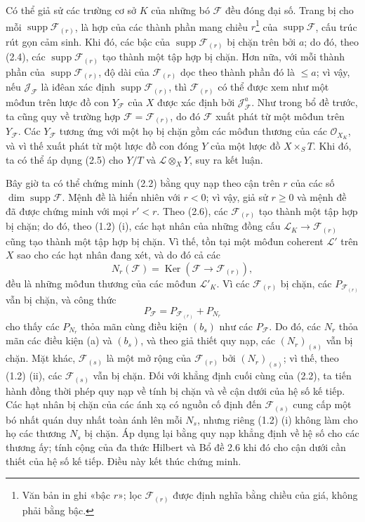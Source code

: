 Có thể giả sử các trường cơ sở $K$ của những bó $\mathcal F$ đều đóng đại số.
Trang bị cho mỗi $\operatorname{supp}\mathcal F_{(r)}$, là hợp của các thành
phần mang chiều $r$\footnote{Văn bản in ghi «bậc $r$»; lọc
$\mathcal F_{(r)}$ được định nghĩa bằng chiều của giá, không phải bằng bậc.}
của $\operatorname{supp}\mathcal F$, cấu trúc rút gọn cảm sinh. Khi đó, các
bậc của $\operatorname{supp}\mathcal F_{(r)}$ bị chặn trên bởi $a$; do đó,
theo (2.4), các $\operatorname{supp}\mathcal F_{(r)}$ tạo thành một tập hợp bị
chặn. Hơn nữa, với mỗi thành phần của
$\operatorname{supp}\mathcal F_{(r)}$, độ dài của $\mathcal F_{(r)}$ dọc theo
thành phần đó là $\leq a$; vì vậy, nếu $\mathcal J_{\mathcal F}$ là iđêan xác
định $\operatorname{supp}\mathcal F_{(r)}$, thì $\mathcal F_{(r)}$
có thể được xem như một môđun trên lược đồ con $Y_{\mathcal F}$ của $X$ được
xác định bởi $\mathcal J_{\mathcal F}^{a}$. Như trong bổ đề trước, ta cũng quy
về trường hợp $\mathcal F=\mathcal F_{(r)}$, do đó $\mathcal F$ xuất phát từ
một môđun trên $Y_{\mathcal F}$. Các $Y_{\mathcal F}$ tương ứng với một họ bị
chặn gồm các môđun thương của các $\mathcal O_{X_K}$, và vì thế xuất phát từ
một lược đồ con đóng $Y$ của một lược đồ $X\times_S T$. Khi đó, ta có thể áp
dụng (2.5) cho $Y/T$ và $\mathcal L\otimes_XY$, suy ra kết luận.

Bây giờ ta có thể chứng minh (2.2) bằng quy nạp theo cận trên $r$ của các số
$\dim\operatorname{supp}\mathcal F$. Mệnh đề là hiển nhiên với $r<0$; vì vậy,
giả sử $r\geq0$ và mệnh đề đã được chứng minh với mọi $r'<r$. Theo (2.6), các
$\mathcal F_{(r)}$ tạo thành một tập hợp bị chặn; do đó, theo (1.2) (i), các
hạt nhân của những đồng cấu
$\mathcal L_K\longrightarrow\mathcal F_{(r)}$ cũng tạo thành một tập hợp bị
chặn. Vì thế, tồn tại một môđun coherent $\mathcal L'$ trên $X$ sao cho các hạt
nhân đang xét, và do đó cả các
\[
N_r(\mathcal F)=\operatorname{Ker}(\mathcal F\longrightarrow\mathcal F_{(r)}),
\]
đều là những môđun thương của các môđun $\mathcal L'_K$. Vì các
$\mathcal F_{(r)}$ bị chặn, các $P_{\mathcal F_{(r)}}$ vẫn bị chặn, và công
thức
\[
P_{\mathcal F}=P_{\mathcal F_{(r)}}+P_{N_r}
\]
cho thấy các $P_{N_r}$ thỏa mãn cùng điều kiện $(b_s)$ như các
$P_{\mathcal F}$. Do đó, các $N_r$ thỏa mãn các điều kiện (a) và $(b_s)$, và
theo giả thiết quy nạp, các $(N_r)_{(s)}$ vẫn bị chặn. Mặt khác,
$\mathcal F_{(s)}$ là một mở rộng của $\mathcal F_{(r)}$ bởi
$(N_r)_{(s)}$; vì thế, theo (1.2) (ii), các $\mathcal F_{(s)}$ vẫn bị chặn.
Đối với khẳng định cuối cùng của (2.2), ta tiến hành đồng thời phép quy nạp về tính bị chặn và về cận dưới của hệ số kế tiếp. Các hạt nhân bị chặn của các ánh xạ có nguồn cố định đến $\mathcal F_{(s)}$ cung cấp một bó nhất quán duy nhất toàn ánh lên mỗi $N_s$, nhưng riêng (1.2) (i) không làm cho họ các thương $N_s$ bị chặn. Áp dụng lại bằng quy nạp khẳng định về hệ số cho các thương ấy; tính cộng của đa thức Hilbert và Bổ đề 2.6 khi đó cho cận dưới cần thiết của hệ số kế tiếp. Điều này kết thúc chứng
minh.

